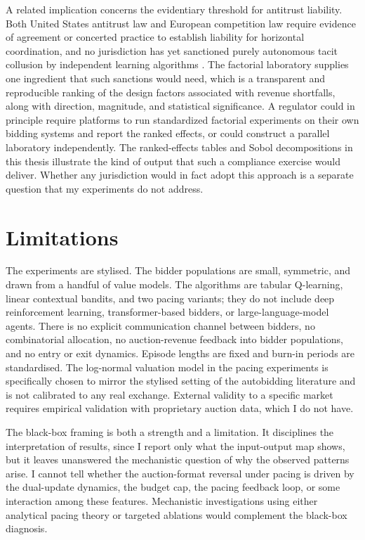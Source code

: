 A related implication concerns the evidentiary threshold for antitrust liability. Both United States antitrust law and European competition law require evidence of agreement or concerted practice to establish liability for horizontal coordination, and no jurisdiction has yet sanctioned purely autonomous tacit collusion by independent learning algorithms \citep{EzrachiStucke2017, Mehra2016}. The factorial laboratory supplies one ingredient that such sanctions would need, which is a transparent and reproducible ranking of the design factors associated with revenue shortfalls, along with direction, magnitude, and statistical significance. A regulator could in principle require platforms to run standardized factorial experiments on their own bidding systems and report the ranked effects, or could construct a parallel laboratory independently. The ranked-effects tables and Sobol decompositions in this thesis illustrate the kind of output that such a compliance exercise would deliver. Whether any jurisdiction would in fact adopt this approach is a separate question that my experiments do not address.

\section{Limitations}
\label{sec:limitations}

The experiments are stylised. The bidder populations are small, symmetric, and drawn from a handful of value models. The algorithms are tabular Q-learning, linear contextual bandits, and two pacing variants; they do not include deep reinforcement learning, transformer-based bidders, or large-language-model agents. There is no explicit communication channel between bidders, no combinatorial allocation, no auction-revenue feedback into bidder populations, and no entry or exit dynamics. Episode lengths are fixed and burn-in periods are standardised. The log-normal valuation model in the pacing experiments is specifically chosen to mirror the stylised setting of the autobidding literature and is not calibrated to any real exchange. External validity to a specific market requires empirical validation with proprietary auction data, which I do not have.

The black-box framing is both a strength and a limitation. It disciplines the interpretation of results, since I report only what the input-output map shows, but it leaves unanswered the mechanistic question of why the observed patterns arise. I cannot tell whether the auction-format reversal under pacing is driven by the dual-update dynamics, the budget cap, the pacing feedback loop, or some interaction among these features. Mechanistic investigations using either analytical pacing theory or targeted ablations would complement the black-box diagnosis.

